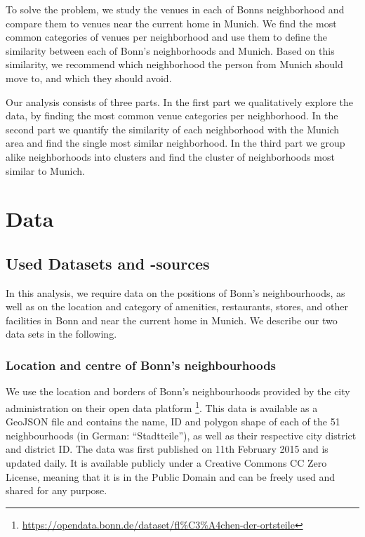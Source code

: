 \documentclass[UKenglish]{scrreprt}
\begin{document}
To solve the problem, we study the venues in each of Bonns neighborhood and compare them to venues near the current home in Munich. We find the most common categories of venues per neighborhood and use them to define the similarity between each of Bonn's neighborhoods and Munich. Based on this similarity, we recommend which neighborhood the person from Munich should move to, and which they should avoid.

Our analysis consists of three parts. In the first part we qualitatively explore the data, by finding the most common venue categories per neighborhood. In the second part we quantify the similarity of each neighborhood with the Munich area and find the single most similar neighborhood. In the third part we group alike neighborhoods into clusters and find the cluster of neighborhoods most similar to Munich.
%
%

\chapter{Data}
\label{sec:Data}

\section{Used Datasets and -sources}
In this analysis, we require data on the positions of Bonn's neighbourhoods, as well as on the location and category of amenities, restaurants, stores, and other facilities in Bonn and near the current home in Munich. We describe our two data sets in the following.

\subsection{Location and centre of Bonn's neighbourhoods}
We use the location and borders of Bonn's neighbourhoods provided by the city administration on their open data platform \footnote{\href{https://opendata.bonn.de/dataset/fl\%C3\%A4chen-der-ortsteile}{https://opendata.bonn.de/dataset/fl\%C3\%A4chen-der-ortsteile}}\cite{Ortsteile}. This data is available as a GeoJSON file and contains the name, ID and polygon shape of each of the 51 neighbourhoods (in German: \enquote{Stadtteile}), as well as their respective city district and district ID.
The data was first published on 11th February 2015 and is updated daily. It is available publicly under a Creative Commons CC Zero License, meaning that 
it is in the Public Domain and can be freely used and shared for any purpose.
\end{document}
